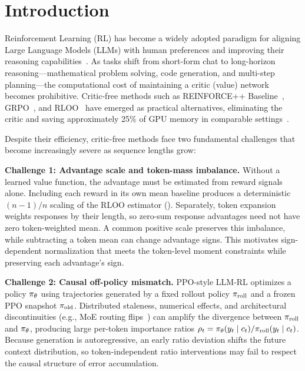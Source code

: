 \section{Introduction}

Reinforcement Learning (RL) has become a widely adopted paradigm for aligning Large Language Models (LLMs) with human preferences and improving their reasoning capabilities~\citep{zeng2025simplerl, guo2025deepseek}. As tasks shift from short-form chat to long-horizon reasoning---mathematical problem solving, code generation, and multi-step planning---the computational cost of maintaining a critic (value) network becomes prohibitive. Critic-free methods such as REINFORCE++ Baseline~\citep{hu2025reinforce}, GRPO~\citep{shao2024deepseekmath}, and RLOO~\citep{ahmadian2024back} have emerged as practical alternatives, eliminating the critic and saving approximately 25\% of GPU memory in comparable settings~\citep{hu2025reinforce}.

Despite their efficiency, critic-free methods face two fundamental challenges that become increasingly severe as sequence lengths grow:

\textbf{Challenge 1: Advantage scale and token-mass imbalance.} Without a learned value function, the advantage must be estimated from
reward signals alone. Including each reward in its own mean baseline produces a deterministic $(n-1)/n$ scaling of the RLOO estimator
(). Separately, token expansion weights responses by their length, so zero-sum response advantages need not have zero
token-weighted mean. A common positive scale preserves this imbalance, while subtracting a token mean can change advantage signs.
This motivates sign-dependent normalization that meets the token-level moment constraints while preserving each advantage's sign.

\textbf{Challenge 2: Causal off-policy mismatch.} PPO-style LLM-RL optimizes a policy $\pi_{\theta}$ using trajectories generated by a fixed
rollout policy $\pi_{\mathrm{roll}}$ and a frozen PPO snapshot $\pi_{\mathrm{old}}$. Distributed staleness, numerical effects, and architectural
discontinuities (e.g., MoE routing flips~\citep{liu2024deepseek}) can amplify the divergence between $\pi_{\mathrm{roll}}$ and $\pi_{\theta}$, producing
large per-token importance ratios $\rho_t=\pi_{\theta}(y_t\mid c_t)/\pi_{\mathrm{roll}}(y_t\mid c_t)$. Because generation is autoregressive, an early ratio
deviation shifts the
future context distribution, so token-independent ratio interventions may fail to respect the causal structure of error accumulation.

